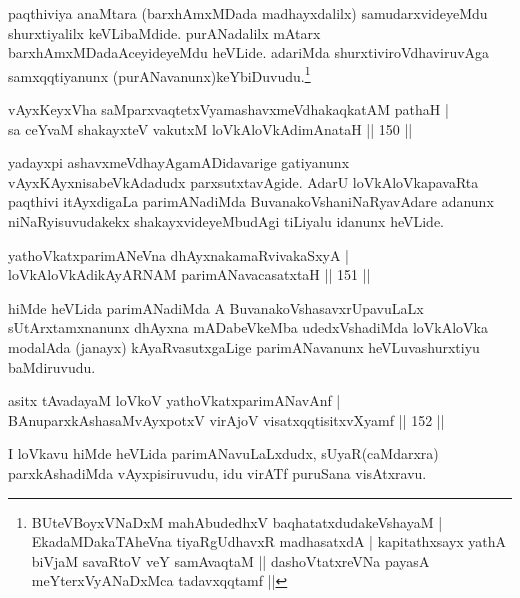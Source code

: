 \begin{artha}
paqthiviya anaMtara (barxhAmxMDada madhayxdalilx) samudarxvideyeMdu shurxtiyalilx keVLibaMdide. purANadalilx mAtarx barxhAmxMDada\break AceyideyeMdu heVLide. adariMda shurxtiviroVdhaviruvAga samxqqti\-yanunx (purANavanunx)keYbiDuvudu.\footnote{BUteVBoyxVNaDxM mahAbudedhxV baqhatatxdudakeVshayaM |
 EkadaMDakaTAheVna tiyaRgUdhavxR madhasatxdA |
 kapitathxsayx yathA biVjaM savaRtoV veY samAvaqtaM ||
 dashoVtatxreVNa payasA meYterxVyANaDxMca tadavxqqtamf ||}
\end{artha}

\begin{shl}
vAyxKeyxVha saMparxvaqtetxVyamashavxmeVdhakaqkatAM pathaH |\\
sa ceYvaM shakayxteV vakutxM loVkAloVkAdimAnataH \hfill || 150 ||
\end{shl}

\begin{artha}
yadayxpi ashavxmeVdhayAgamADidavarige gatiyanunx vAyxKAyxnisabeVkAdadudx parxsutxtavAgide. AdarU loVkAloVkapavaRta paqthivi itAyxdigaLa parimANadiMda BuvanakoVshaniNaRyavAdare adanunx niNaRyisuvudakekx shakayxvideyeMbudAgi tiLiyalu idanunx heVLide.
\end{artha}


\begin{shl}
yathoVkatxparimANeVna dhAyxnakamaRvivakaSxyA |\\
loVkAloVkAdikAyARNAM parimANavacasatxtaH \hfill || 151 ||
\end{shl}

\begin{artha}
hiMde heVLida parimANadiMda A BuvanakoVshasavxrUpavuLaLx sUtArxtamxnanunx dhAyxna mADabeVkeMba udedxVshadiMda loVkAloVka modalAda (janayx) kAyaRvasutxgaLige parimANavanunx heVLuva\break shurxtiyu baMdiruvudu.
\end{artha}


\begin{shl}
asitx tAvadayaM loVkoV yathoVkatxparimANavAnf |\\
BAnuparxkAshasaMvAyxpotxV virAjoV visatxqqtisitxvXyamf \hfill || 152 ||
\end{shl}

\begin{artha}
I loVkavu hiMde heVLida parimANavuLaLxdudx, sUyaR(caMdarxra) parxkAshadiMda vAyxpisiruvudu, idu virATf puruSana visAtxravu.
\end{artha}

